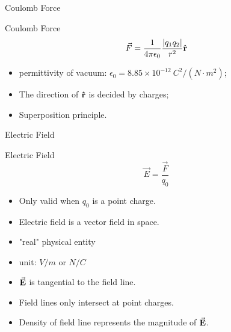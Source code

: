 \documentclass{beamer}
\begin{document}
\begin{frame}{Coulomb Force}	
	\begin{beamerboxesrounded}{Coulomb Force}
		\begin{equation}
			\vec{F} = \frac{1}{4\pi\epsilon_0} \frac{\abs{q_1 q_2}}{r^2} \vu{r}
		\end{equation}	
    \end{beamerboxesrounded}

	\begin{itemize}
		\item permittivity of vacuum: $\epsilon_0 = 8.85 \times 10^{-12} \  C^2/(N \cdot m^2)$;
        \item The direction of $\vu{r}$ is decided by charges;
        \item Superposition principle.
	\end{itemize}
\end{frame}


\begin{frame}{Electric Field}	
	\begin{beamerboxesrounded}[shadow=true]{Electric Field}
        \begin{equation}
			\vec{E} = \frac{\vec{F}}{q_0}
		\end{equation}
    \end{beamerboxesrounded}
	
	\begin{itemize}
		\item Only valid when $q_0$ is a point charge.
		\item Electric field is a vector field in space.
		\item "real" physical entity
        \item unit: $V/m$ or $N/C$
        \item $\va{E}$ is tangential to the field line.
		\item Field lines only intersect at point charges.
		\item Density of field line represents the magnitude of $\va{E}$.
	\end{itemize}
\end{frame}
\end{document}
